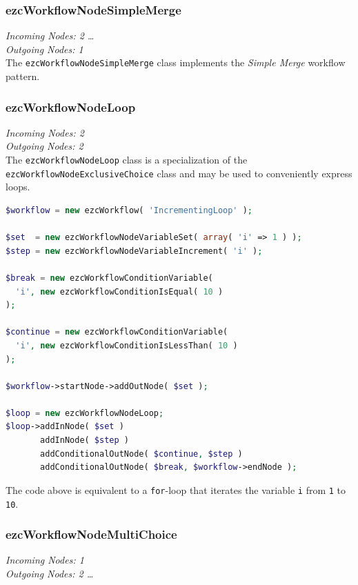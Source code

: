 \subsubsection{ezcWorkflowNodeSimpleMerge}

\emph{Incoming Nodes: 2 \dots *}\\
\emph{Outgoing Nodes: 1}\\

The \texttt{ezcWorkflowNodeSimpleMerge} class implements the \emph{Simple Merge}
workflow pattern.

\subsubsection{ezcWorkflowNodeLoop}

\emph{Incoming Nodes: 2}\\
\emph{Outgoing Nodes: 2}\\

The \texttt{ezcWorkflowNodeLoop} class is a specialization of the
\texttt{ezcWorkflowNodeExclusiveChoice} class and may be used to conveniently
express loops.

\begin{lstlisting}[language=PHP]
$workflow = new ezcWorkflow( 'IncrementingLoop' );

$set  = new ezcWorkflowNodeVariableSet( array( 'i' => 1 ) );
$step = new ezcWorkflowNodeVariableIncrement( 'i' );

$break = new ezcWorkflowConditionVariable(
  'i', new ezcWorkflowConditionIsEqual( 10 )
);

$continue = new ezcWorkflowConditionVariable(
  'i', new ezcWorkflowConditionIsLessThan( 10 )
);

$workflow->startNode->addOutNode( $set );

$loop = new ezcWorkflowNodeLoop;
$loop->addInNode( $set )
       addInNode( $step )
       addConditionalOutNode( $continue, $step )
       addConditionalOutNode( $break, $workflow->endNode );
\end{lstlisting}

The code above is equivalent to a \texttt{for}-loop that iterates the variable
\texttt{i} from \texttt{1} to \texttt{10}.

\subsubsection{ezcWorkflowNodeMultiChoice}

\emph{Incoming Nodes: 1}\\
\emph{Outgoing Nodes: 2 \dots *}\\

